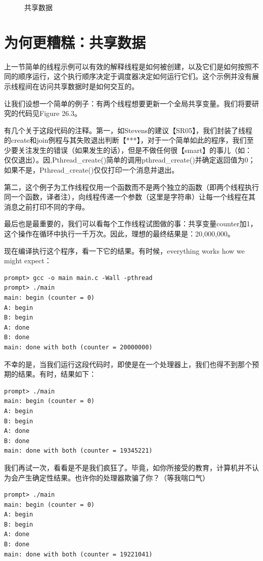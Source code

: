 \begin{figure}[h]
\caption{共享数据}
\end{figure}

\section{为何更糟糕：共享数据}
上一节简单的线程示例可以有效的解释线程是如何被创建，以及它们是如何按照不同的顺序运行，这个执行顺序决定于调度器决定如何运行它们。这个示例并没有展示线程间在访问共享数据时是如何交互的。

让我们设想一个简单的例子：有两个线程想要更新一个全局共享变量。我们将要研究的代码见Figure 26.3。

有几个关于这段代码的注释。第一，如Stevens的建议【SR05】，我们封装了线程的create和join例程与其失败退出判断【***】，对于一个简单如此的程序，我们至少要关注发生的错误（如果发生的话），但是不做任何很【smart】的事儿（如：仅仅退出）。因,Pthread\_create()简单的调用pthread\_create()并确定返回值为0；如果不是，Pthread\_create()仅仅打印一个消息并退出。

第二，这个例子为工作线程仅用一个函数而不是两个独立的函数（即两个线程执行同一个函数，译者注），向线程传递一个参数（这里是字符串）让每一个线程在其消息之前打印不同的字母。

最后也是最重要的，我们可以看每个工作线程试图做的事：共享变量counter加1，这个操作在循环中执行一千万次。因此，理想的最终结果是：20,000,000。

现在编译执行这个程序，看一下它的结果。有时候，everything works how we might expect：
\begin{verbatim}
prompt> gcc -o main main.c -Wall -pthread
prompt> ./main
main: begin (counter = 0)
A: begin
B: begin
A: done
B: done
main: done with both (counter = 20000000)
\end{verbatim}

不幸的是，当我们运行这段代码时，即使是在一个处理器上，我们也得不到那个预期的结果。有时，结果如下：
\begin{verbatim}
prompt> ./main
main: begin (counter = 0)
A: begin
B: begin
A: done
B: done
main: done with both (counter = 19345221)
\end{verbatim}

我们再试一次，看看是不是我们疯狂了。毕竟，如你所接受的教育，计算机并不认为会产生确定性结果。也许你的处理器欺骗了你？（等我喘口气）
\begin{verbatim}
prompt> ./main
main: begin (counter = 0)
A: begin
B: begin
A: done
B: done
main: done with both (counter = 19221041)
\end{verbatim}

